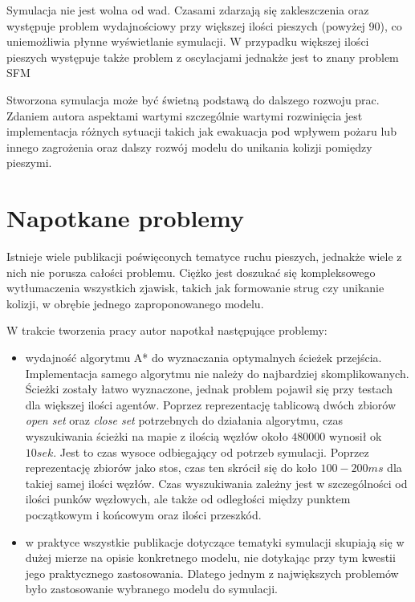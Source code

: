 Symulacja nie jest wolna od wad. Czasami zdarzają się zakleszczenia oraz występuje problem wydajnościowy przy większej ilości pieszych (powyżej 90), co uniemożliwia płynne wyświetlanie symulacji. W przypadku większej ilości pieszych występuje także problem z oscylacjami jednakże jest to znany problem SFM \citep{oscillations}

Stworzona symulacja może być świetną podstawą do dalszego rozwoju prac. Zdaniem autora aspektami wartymi szczególnie wartymi rozwinięcia jest implementacja różnych sytuacji takich jak ewakuacja pod wpływem pożaru lub innego zagrożenia oraz dalszy rozwój modelu do unikania kolizji pomiędzy pieszymi.

\section{Napotkane problemy}

Istnieje wiele publikacji poświęconych tematyce ruchu pieszych, jednakże wiele z nich nie porusza całości problemu. Ciężko jest doszukać się kompleksowego wytłumaczenia wszystkich zjawisk, takich jak formowanie strug czy unikanie kolizji, w obrębie jednego zaproponowanego modelu.

W trakcie tworzenia pracy autor napotkał następujące problemy:

\begin{itemize}
\item wydajność algorytmu A* do wyznaczania optymalnych ścieżek przejścia. Implementacja samego algorytmu nie należy do najbardziej skomplikowanych. Ścieżki zostały łatwo wyznaczone, jednak problem pojawił się przy testach dla większej ilości agentów. Poprzez reprezentację tablicową dwóch zbiorów \textit{open set} oraz \textit{close set} potrzebnych do działania algorytmu, czas wyszukiwania ścieżki na mapie z ilością węzłów około $480000$ wynosił ok $10 sek$. Jest to czas wysoce odbiegający od potrzeb symulacji. Poprzez reprezentację zbiorów jako stos, czas ten skrócił się do koło $100-200 ms$ dla takiej samej ilości węzłów. Czas wyszukiwania zależny jest w szczególności od ilości punków węzłowych, ale także od odległości między punktem początkowym i końcowym oraz ilości przeszkód.

\item w praktyce wszystkie publikacje dotyczące tematyki symulacji skupiają się w dużej mierze na opisie konkretnego modelu, nie dotykając przy tym kwestii jego praktycznego zastosowania. Dlatego jednym z największych problemów było zastosowanie wybranego modelu do symulacji.
\end{itemize}
